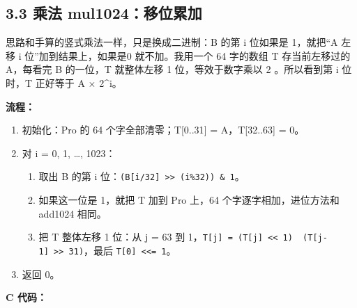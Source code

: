 \documentclass[11pt,a4paper]{ctexart}
\providecommand{\tightlist}{\setlength{\itemsep}{0pt}\setlength{\parskip}{0pt}}
\begin{document}
\FloatBarrier

\hypertarget{ux4e58ux6cd5-mul1024ux79fbux4f4dux7d2fux52a0}{%
\subsection{3.3 乘法
mul1024：移位累加}\label{ux4e58ux6cd5-mul1024ux79fbux4f4dux7d2fux52a0}}

思路和手算的竖式乘法一样，只是换成二进制：B 的第 i 位如果是 1，就把``A
左移 i 位''加到结果上，如果是0 就不加。我用一个 64 字的数组 T
存当前左移过的 A，每看完 B 的一位，T 就整体左移 1 位，等效于数字乘以 2
。所以看到第 i 位时，T 正好等于 A \ensuremath{\times} 2\^{}i。


\textbf{流程：}

\begin{enumerate}
\def\labelenumi{\arabic{enumi}.}
\tightlist
\item
  初始化：Pro 的 64 个字全部清零；T{[}0..31{]} = A，T{[}32..63{]} = 0。
\item
  对 i = 0, 1, \ldots, 1023：

  \begin{enumerate}
  \def\labelenumii{\arabic{enumii}.}
  \tightlist
  \item
    取出 B 的第 i
    位：\texttt{(B{[}i/32{]}\ \textgreater{}\textgreater{}\ (i\%32))\ \&\ 1}。
  \item
    如果这一位是 1，就把 T 加到 Pro 上，64 个字逐字相加，进位方法和
    add1024 相同。
  \item
    把 T 整体左移 1 位：从 j = 63 到
    1，\texttt{T{[}j{]}\ =\ (T{[}j{]}\ \textless{}\textless{}\ 1)\ \textbar{}\ (T{[}j-1{]}\ \textgreater{}\textgreater{}\ 31)}，最后
    \texttt{T{[}0{]}\ \textless{}\textless{}=\ 1}。
  \end{enumerate}
\item
  返回 0。
\end{enumerate}


\textbf{C 代码：}
\end{document}
